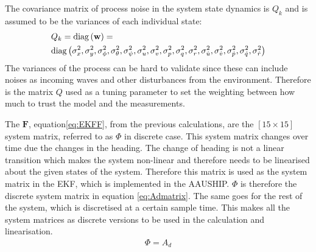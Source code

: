 The covariance matrix of process noise in the system state dynamics is $Q_k$ and is assumed to be the variances of each individual state:
\begin{align}
&Q_k = \mathrm{diag}\left(\mathbf{w}\right) = \\ \nonumber
&\mathrm{diag}\left(\sigma_{x}^2, \sigma_{y}^2, \sigma_{\phi}^2, \sigma_{\theta}^2, \sigma_{\psi}^2, \sigma_{u}^2, \sigma_{v}^2, \sigma_{p}^2, \sigma_{q}^2, \sigma_{r}^2, \sigma_{\dot u}^2, \sigma_{\dot v}^2, \sigma_{\dot p}^2, \sigma_{\dot q}^2, \sigma_{\dot r}^2\right)
\end{align}
The variances of the process can be hard to validate since these can include noises as incoming waves and other disturbances from the environment. Therefore is the matrix $Q$ used as a tuning parameter to set the weighting between how much to trust the model and the measurements.

The $\mathbf F$, equation\ref{eq:EKFF}, from the previous calculations, are the $[15 \times 15]$ system matrix, referred to as $\Phi$ in discrete case. This system matrix changes over time due the changes in the heading. The change of heading is not a linear transition which makes the system non-linear and therefore needs to be linearised about the given states of the system. Therefore this matrix is used as the system matrix in the \ac{EKF}, which is implemented in the AAUSHIP. $\Phi$ is therefore the discrete system matrix in equation \ref{eq:Admatrix}. The same goes for the rest of the system, which is discretised at a certain sample time. This makes all the system matrices as discrete versions to be used in the calculation and linearisation.
\begin{align}
\Phi = A_d
\label{eq:Admatrix}
\end{align}

